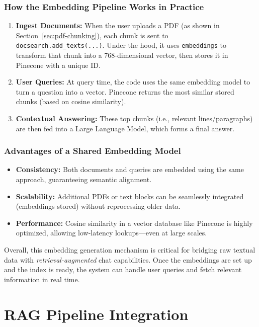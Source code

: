 \subsubsection*{How the Embedding Pipeline Works in Practice}
\begin{enumerate}
    \item \textbf{Ingest Documents:} 
    When the user uploads a PDF (as shown in Section~\ref{sec:pdf-chunking}), each chunk is sent to \texttt{docsearch.add\_texts(...)}. Under the hood, it uses \texttt{embeddings} to transform that chunk into a 768-dimensional vector, then stores it in Pinecone with a unique ID.
    \item \textbf{User Queries:} 
    At query time, the code uses the same embedding model to turn a question into a vector. Pinecone returns the most similar stored chunks (based on cosine similarity).
    \item \textbf{Contextual Answering:} 
    These top chunks (i.e., relevant lines/paragraphs) are then fed into a Large Language Model, which forms a final answer. 
\end{enumerate}

\subsubsection*{Advantages of a Shared Embedding Model}
\begin{itemize}
    \item \textbf{Consistency:} Both documents and queries are embedded using the same approach, guaranteeing semantic alignment.
    \item \textbf{Scalability:} Additional PDFs or text blocks can be seamlessly integrated (embeddings stored) without reprocessing older data.
    \item \textbf{Performance:} Cosine similarity in a vector database like Pinecone is highly optimized, allowing low-latency lookups—even at large scales.
\end{itemize}

\noindent Overall, this embedding generation mechanism is critical for bridging raw textual data with \emph{retrieval-augmented} chat capabilities. Once the embeddings are set up and the index is ready, the system can handle user queries and fetch relevant information in real time.

\section{RAG Pipeline Integration}
\label{sec:rag-pipeline}

